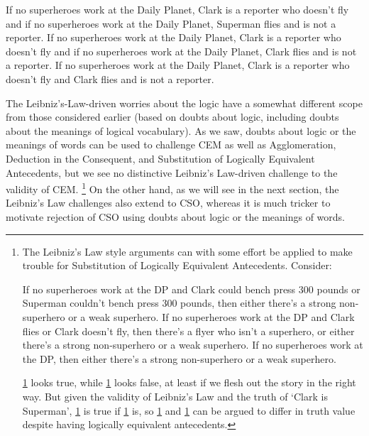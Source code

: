 \documentclass[If.tex]{subfiles}
\begin{document}
\begin{prop}
	\nitem
	\begin{prop}
		\aitem
		If no superheroes work at the Daily Planet, Clark is a reporter who doesn't fly and if no superheroes work at the Daily Planet, Superman flies and is not a reporter.
		\aitem
		If no superheroes work at the Daily Planet, Clark is a reporter who doesn't fly and if no superheroes work at the Daily Planet, Clark flies and is not a reporter.
		\aitem
		If no superheroes work at the Daily Planet, Clark is a reporter who doesn't fly and Clark flies and is not a reporter.
	\end{prop}
\end{prop}	


 

The Leibniz's-Law-driven worries about the logic have a somewhat different scope from those considered earlier (based on doubts about logic, including doubts about the meanings of logical vocabulary).  As we saw, doubts about logic or the meanings of words can be used to challenge CEM as well as Agglomeration, Deduction in the Consequent, and Substitution of Logically Equivalent Antecedents, but we see no distinctive Leibniz's Law-driven challenge to the validity of CEM.%
\footnote{The Leibniz's Law style arguments can with some effort be applied to make trouble for Substitution of Logically Equivalent Antecedents.  Consider:
	\begin{prop}
		\aitem \label{aa}
		If no superheroes work at the DP and Clark could bench press 300 pounds or Superman couldn't bench press 300 pounds, then either there's a strong non-superhero or a weak superhero. 
		\aitem \label{bb}
		If no superheroes work at the DP and Clark flies or Clark doesn't fly, then there's a flyer who isn't a superhero, or either there's a strong non-superhero or a weak superhero. 
		\aitem \label{cc}
		If no superheroes work at the DP, then either there's a strong non-superhero or a weak superhero. 
	\end{prop}
	\ref{aa} looks true, while \ref{cc} looks false, at least if we flesh out the story in the right way.  But given the validity of Leibniz's Law and the truth of ‘Clark is Superman’, \ref{bb} is true if \ref{aa} is, so \ref{bb} and \ref{cc} can be argued to differ in truth value despite having logically equivalent antecedents.}
On the other hand, as we will see in the next section, the Leibniz's Law challenges also extend to CSO, whereas it is much tricker to motivate rejection of CSO using doubts about logic or the meanings of words.  
\end{document}

